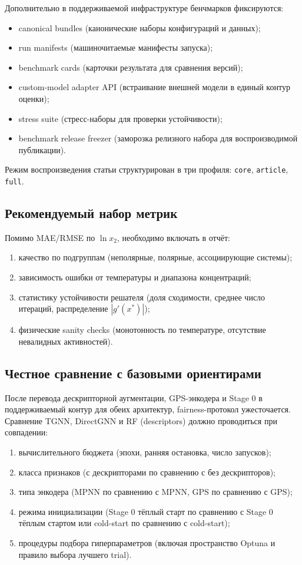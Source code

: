 \documentclass[11pt]{article}
\begin{document}
Дополнительно в поддерживаемой инфраструктуре бенчмарков фиксируются:
\begin{itemize}
  \item canonical bundles (канонические наборы конфигураций и данных);
  \item run manifests (машиночитаемые манифесты запуска);
  \item benchmark cards (карточки результата для сравнения версий);
  \item custom-model adapter API (встраивание внешней модели в единый контур оценки);
  \item stress suite (стресс-наборы для проверки устойчивости);
  \item benchmark release freezer (заморозка релизного набора для воспроизводимой публикации).
\end{itemize}

Режим воспроизведения статьи структурирован в три профиля:
\texttt{core}, \texttt{article}, \texttt{full}.

\subsection{Рекомендуемый набор метрик}

Помимо MAE/RMSE по $\ln x_2$, необходимо включать в отчёт:
\begin{enumerate}
  \item качество по подгруппам (неполярные, полярные, ассоциирующие системы);
  \item зависимость ошибки от температуры и диапазона концентраций;
  \item статистику устойчивости решателя (доля сходимости, среднее число итераций, распределение $|g'(x^*)|$);
  \item физические sanity checks (монотонность по температуре, отсутствие невалидных активностей).
\end{enumerate}

\subsection{Честное сравнение с базовыми ориентирами}

После перевода дескрипторной аугментации, GPS-энкодера и Stage 0 в поддерживаемый контур для обеих архитектур, fairness-протокол ужесточается. Сравнение TGNN, DirectGNN и RF (descriptors) должно проводиться при совпадении:
\begin{enumerate}
  \item вычислительного бюджета (эпохи, ранняя остановка, число запусков);
  \item класса признаков (с дескрипторами по сравнению с без дескрипторов);
  \item типа энкодера (MPNN по сравнению с MPNN, GPS по сравнению с GPS);
  \item режима инициализации (Stage 0 тёплый старт по сравнению с Stage 0 тёплым стартом или cold-start по сравнению с cold-start);
  \item процедуры подбора гиперпараметров (включая пространство Optuna и правило выбора лучшего trial).
\end{enumerate}
\end{document}
